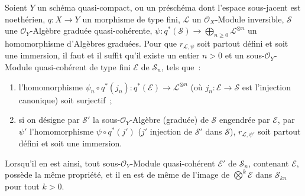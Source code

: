 \begin{proposition}[3.8.5]
\label{II.3.8.5-fr}
Soient $Y$ un schéma quasi-compact, ou un préschéma dont l'espace sous-jacent
est noethérien, $q:X\to Y$ un morphisme \textup{de type fini}, $\mathcal{L}$ un
$\mathcal{O}_X$-Module inversible, $\mathcal{S}$ une $\mathcal{O}_Y$-Algèbre
graduée quasi-cohérente,
$\psi:q^*(\mathcal{S})\to\bigoplus_{n\geq0}\mathcal{L}^{\otimes n}$ un
homomorphisme d'Algèbres graduées. Pour que $r_{\mathcal{L},\psi}$ soit
partout défini et soit une immersion, il faut et il suffit qu'il existe un
entier $n>0$ et un sous-$\mathcal{O}_Y$-Module quasi-cohérent \textup{de type fini}
$\mathcal{E}$ de $\mathcal{S}_n$, tels que~:
\begin{enumerate}
  \item[\textup{a)}] l'homomorphisme
    $\psi_n\circ q^*(j_n):q^*(\mathcal{E})\to\mathcal{L}^{\otimes n}$
    (où $j_n:\mathcal{E}\to\mathcal{S}$ est l'injection canonique) soit
    surjectif~;
  \item[\textup{b)}] si on désigne par $\mathcal{S}'$ la sous-$\mathcal{O}_Y$-Algèbre
    (graduée) de $\mathcal{S}$ engendrée par $\mathcal{E}$, par $\psi'$
    l'homomorphisme $\psi\circ q^*(j')$ ($j'$ injection de $\mathcal{S}'$
    dans $\mathcal{S}$), $r_{\mathcal{L},\psi'}$ soit partout défini et soit
    une immersion.
\end{enumerate}

Lorsqu'il en est ainsi, tout sous-$\mathcal{O}_Y$-Module quasi-cohérent
$\mathcal{E}'$ de $\mathcal{S}_n$, contenant $\mathcal{E}$, possède la même
propriété, et il en est de même de l'image de $\bigotimes^k\mathcal{E}$ dans
$\mathcal{S}_{kn}$ pour tout $k>0$.
\end{proposition}

